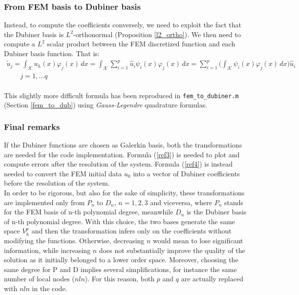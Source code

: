 \documentclass[a4paper,11pt]{article}
\begin{document}
	\subsubsection{From FEM basis to Dubiner basis}
	\noindent Instead, to compute the coefficients conversely, we need to exploit the fact that the Dubiner basis is $L^2$-orthonormal (Proposition \ref{l2_ortho}). We then need to compute a $L^2$ scalar product between the FEM discretized function and each Dubiner basis function. That is:
	\begin{equation}\label{ref4}
	\begin{gathered}
	\tilde{u}_j = \int_\mathcal{K} u_h(x) \varphi_j(x) \,dx = \int_{\mathcal{K}} \sum_{i=1}^p \hat{u}_i\psi_i(x) \varphi_j(x) \,dx = \sum_{i=1}^p \Big(\int_{\mathcal{K}}\psi_i(x)\varphi_j(x)\,dx \Big) \hat{u}_i \\
	 \qquad j=1,\dots q
	\end{gathered}
	\end{equation}
	\vspace{2mm} \\
	\noindent This slightly more difficult formula has been reproduced in \texttt{fem\_to\_dubiner.m} (Section \ref{fem_to_dub}) using \emph{Gauss-Legendre} quadrature formulas.
	\subsubsection{Final remarks}\label{dub}
	\noindent If the Dubiner functions are chosen as Galerkin basis, both the transformations are needed for the code implementation. Formula (\ref{ref3}) is needed to plot and compute errors after the resolution of the system. Formula (\ref{ref4}) is instead needed to convert the FEM initial data $u_0$ into a vector of Dubiner coefficients before the resolution of the system.\\
	
	\noindent In order to be rigorous, but also for the sake of simplicity, these transformations are implemented only from $P_n$ to $D_n$, $n=1,2,3$ and viceversa, where $P_n$ stands for the FEM basis of n-th polynomial degree, meanwhile $D_n$ is the Dubiner basis of n-th polynomial degree. With this choice, the two bases generate the same space $V_h^p$ and then the transformation infers only on the coefficients without modifying the functions. Otherwise, decreasing $n$ would mean to lose significant information, while increasing $n$ does not substantially improve the quality of the solution as it initially belonged to a lower order space. Moreover, choosing the same degree for P and D implies several simplifications, for instance the same number of local nodes ($nln$). For this reason, both $p$ and $q$ are actually replaced with $nln$ in the code.
	
\end{document}
